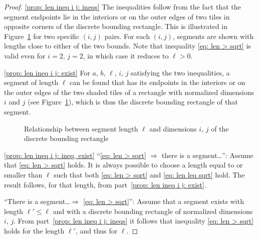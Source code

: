 \documentclass[12pt, a4paper]{article}
\newcommand{\len}{\ell} %
\begin{document}
\begin{proof}
\ref*{prop: len ineq i j: ineqs} The inequalities follow from the fact that the segment endpoints lie in the interiors or on the outer edges of two tiles in opposite corners of the discrete bounding rectangle. This is illustrated in Figure~\ref{fig: len ineq i j} for two specific $(i,j)$ pairs. For each $(i,j)$, segments are shown with lengths close to either of the two bounds. Note that inequality \eqref{eq: len > sqrt} is valid even for $i=2$, $j=2$, in which case it reduces to $\len>0$.

\ref*{prop: len ineq i j: exist} For $a$, $b$, $\len$, $i$, $j$ satisfying the two inequalities, a segment of length $\len$ can be found that has its endpoints in the interiors or on the outer edges of the two shaded tiles of a rectangle with normalized dimensions $i$ and $j$ (see Figure~\ref{fig: len ineq i j}), which is thus the discrete bounding rectangle of that segment.
\begin{figure}
\centering%
\hfill%
%
\caption{Relationship between segment length $\len$ and dimensions $i$, $j$ of the discrete bounding rectangle
}%
\label{fig: len ineq i j}
\end{figure}%

\ref*{prop: len ineq i j: ineq, exist} ``\eqref{eq: len > sqrt} $\Rightarrow$ there is a segment\ldots'': Assume that \eqref{eq: len > sqrt} holds. It is always possible to choose a length equal to or smaller than $\len$ such that both \eqref{eq: len > sqrt} and \eqref{eq: len leq sqrt} hold. The result follows, for that length, from part~\ref{prop: len ineq i j: exist}.

``There is a segment\ldots $\Rightarrow$ \eqref{eq: len > sqrt}'': Assume that a segment exists with length $\len' \leq \len$ and with a discrete bounding rectangle of normalized dimensions $i$, $j$. From part~\ref{prop: len ineq i j: ineqs} it follows that inequality \eqref{eq: len > sqrt} holds for the length $\len'$, and thus for $\len$.
\end{proof}
\end{document}
